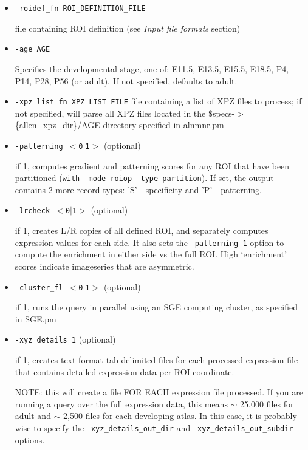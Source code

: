 \documentclass[10pt]{article}
\begin{document}
\begin{itemize}
\item {\tt -roidef\_fn ROI\_DEFINITION\_FILE}

file containing ROI definition (see {\it Input file formats} section)

\item {\tt -age AGE}

Specifies the developmental stage, one of: E11.5, E13.5, E15.5, E18.5, P4, P14, P28, P56 (or adult). If not specified, defaults to adult.

\item {\tt -xpz\_list\_fn XPZ\_LIST\_FILE}
file containing a list of XPZ files to process; if not specified, will parse all XPZ files located in the \$specs-$>$\{allen\_xpz\_dir\}/AGE directory specified in alnmnr.pm

\item {\tt -patterning $<$0$|$1$>$} (optional)

if 1, computes gradient and patterning scores for any ROI that have been partitioned ({\tt with -mode roiop -type partition}). If set, the output contains 2 more record types: 'S' - specificity and 'P' - patterning.

\item {\tt -lrcheck $<$0$|$1$>$} (optional)

if 1, creates L/R copies of all defined ROI, and separately computes expression values for each side. It also sets the {\tt -patterning 1} option to compute the enrichment in either side vs the full ROI. High `enrichment' scores indicate imageseries that are asymmetric.

\item {\tt -cluster\_fl $<$0$|$1$>$} (optional)

if 1, runs the query in parallel using an SGE computing cluster, as specified in SGE.pm

\item {\tt -xyz\_details 1} (optional)

if 1, creates text format tab-delimited files for each processed expression file that contains detailed expression data per ROI coordinate.

NOTE: this will create a file FOR EACH expression file processed. If you are running a query over the full expression data, this means $\sim$ 25,000 files for adult and $\sim$ 2,500 files for each developing atlas. In this case, it is probably wise to specify the {\tt -xyz\_details\_out\_dir} and {\tt -xyz\_details\_out\_subdir} options.


\end{itemize}
\end{document}
